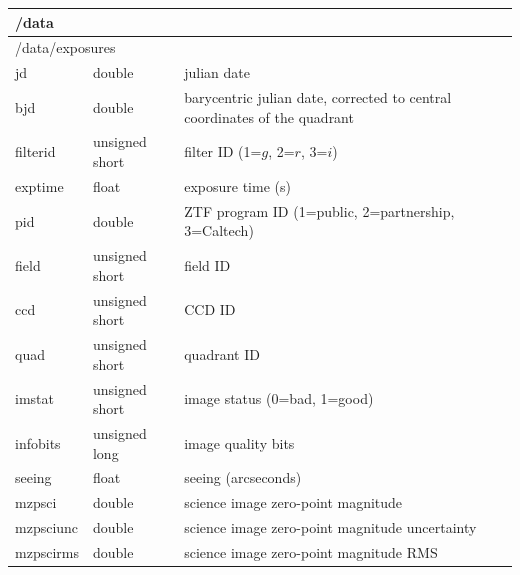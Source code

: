 \documentclass[12pt]{article}
\begin{document}
\begin{table}[ht!]
\centering
\scriptsize
\begin{tabular}{ |p{3.5cm}p{2.5cm}p{9cm}| }
 \hline
 \multicolumn{3}{|l|}{/data} \\
 \hline
 \multicolumn{3}{|l|}{\hspace{0.5cm}/data/exposures} \\
 \hspace{1.0cm}jd          &   double           &   julian date \\
 \hspace{1.0cm}bjd         &   double           &   barycentric julian date, corrected to central coordinates of the quadrant \\
 \hspace{1.0cm}filterid    &   unsigned short   &   filter ID (1=$g$, 2=$r$, 3=$i$) \\
 \hspace{1.0cm}exptime     &   float            &   exposure time (s) \\
 \hspace{1.0cm}pid         &   double           &   ZTF program ID (1=public, 2=partnership, 3=Caltech) \\
 \hspace{1.0cm}field       &   unsigned short   &   field ID \\
 \hspace{1.0cm}ccd         &   unsigned short   &   CCD ID \\
 \hspace{1.0cm}quad        &   unsigned short   &   quadrant ID \\
 \hspace{1.0cm}imstat      &   unsigned short   &   image status (0=bad, 1=good) \\
 \hspace{1.0cm}infobits    &   unsigned long    &   image quality bits \\
 \hspace{1.0cm}seeing      &   float            &   seeing (arcseconds) \\
 \hspace{1.0cm}mzpsci      &   double           &   science image zero-point magnitude \\
 \hspace{1.0cm}mzpsciunc   &   double           &   science image zero-point magnitude uncertainty \\
 \hspace{1.0cm}mzpscirms   &   double           &   science image zero-point magnitude RMS \\

\end{tabular}
\end{table}
\end{document}
